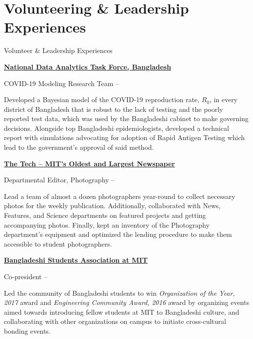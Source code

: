 
\section{Volunteering \& Leadership Experiences}
{Volunteer \& Leadership Experiences}


\href{https://coronalytics.info/}
{\textbf{National Data Analytics Task Force, Bangladesh}}
\par
COVID-19 Modeling Research Team
\hfill
\textbf{} --
\textbf{}

\SmallEntryGap
\begin{detail}
Developed a Bayesian model of the COVID-19 reproduction rate, $R_0$, in every district of Bangladesh that is robust to the lack of testing and the poorly reported test data, which was used by the Bangladeshi cabinet to make governing decisions. Alongside top Bangladeshi epidemiologists, developed a technical report with simulations advocating for adoption of Rapid Antigen Testing which lead to the government's approval of said method.
\end{detail}
\EntryGap

\href{https://thetech.com/}
{\textbf{The Tech -- MIT's Oldest and Largest Newspaper}}
\par
Departmental Editor, Photography
\hfill
\textbf{} --
\textbf{}

\SmallEntryGap
\begin{detail}
Lead a team of almost a dozen photographers year-round to collect necessary photos for the weekly publication. Additionally, collaborated with News, Features, and Science departments on featured projects and getting accompanying photos. Finally, kept an inventory of the Photography department's equipment and optimized the lending procedure to make them accessible to student photographers.

\end{detail}

\EntryGap
\href{http://web.mit.edu/bangladesh/www/}
{\textbf{Bangladeshi Students Association at MIT}}
\par
Co-president
\hfill
\textbf{} --
\textbf{}

\SmallEntryGap
\begin{detail}
Led the community of Bangladeshi students to win \textit{Organization of the Year, 2017} award and \textit{Engineering Community Award, 2016} award by organizing events aimed towards introducing fellow students at MIT to Bangladeshi culture, and collaborating with other organizations on campus to initiate cross-cultural bonding events.
\end{detail}

